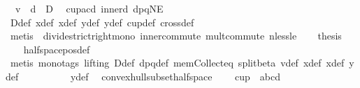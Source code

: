 \begin{isabellebody}
\ {}{\isacharcolon}{\kern0pt}\ {\isachardoublequoteopen}v\ {\isasymbullet}\ d\ {\isasymge}\ D{\isachardoublequoteclose}\ \isamarkupfalse%
\ cup{\isacharunderscore}{\kern0pt}acd\ inner{\isacharunderscore}{\kern0pt}d{}\ dpqNE{}\isanewline
\ \ \ \ \ \ \isamarkupfalse%
\ D{\isacharunderscore}{\kern0pt}def\ x{}{\isacharunderscore}{\kern0pt}def\ x{}{\isacharunderscore}{\kern0pt}def\ y{}{\isacharunderscore}{\kern0pt}def\ y{}{\isacharunderscore}{\kern0pt}def\ cup{}{\isacharunderscore}{\kern0pt}def\ cross{}{\isacharunderscore}{\kern0pt}def\isanewline
\ \ \ \ \ \ \isamarkupfalse%
\ {\isacharparenleft}{\kern0pt}metis\ {\isachardoublequoteopen}{}{\isachardoublequoteclose}\ divide{\isacharunderscore}{\kern0pt}strict{\isacharunderscore}{\kern0pt}right{\isacharunderscore}{\kern0pt}mono\ inner{\isacharunderscore}{\kern0pt}commute\ mult{\isachardot}{\kern0pt}commute\ nless{\isacharunderscore}{\kern0pt}le{\isacharparenright}{\kern0pt}\isanewline
\ \ \isamarkupfalse%
\ {\isacharquery}{\kern0pt}thesis\ \isamarkupfalse%
\ {}\ \isamarkupfalse%
\ halfspace{\isacharunderscore}{\kern0pt}pos{\isacharunderscore}{\kern0pt}def\isanewline
\ \ \ \ \ \ \isamarkupfalse%
\ {\isacharparenleft}{\kern0pt}metis\ {\isacharparenleft}{\kern0pt}mono{\isacharunderscore}{\kern0pt}tags{\isacharcomma}{\kern0pt}\ lifting{\isacharparenright}{\kern0pt}\ D{\isacharunderscore}{\kern0pt}def\ dpq{\isacharunderscore}{\kern0pt}def\ mem{\isacharunderscore}{\kern0pt}Collect{\isacharunderscore}{\kern0pt}eq\ split{\isacharunderscore}{\kern0pt}beta\ v{\isacharunderscore}{\kern0pt}def\ x{}{\isacharunderscore}{\kern0pt}def\ x{}{\isacharunderscore}{\kern0pt}def\ y{}{\isacharunderscore}{\kern0pt}def\isanewline
\ \ \ \ \ \ \ \ \ \ y{}{\isacharunderscore}{\kern0pt}def{\isacharparenright}{\kern0pt}\ \isanewline
{}\isamarkupfalse%
%
\endisatagproof
{\isafoldproof}%
%
\isadelimproof
\isanewline
%
\endisadelimproof
\isanewline
{}\isamarkupfalse%
\ convex{\isacharunderscore}{\kern0pt}hull{\isacharunderscore}{\kern0pt}subset{\isacharunderscore}{\kern0pt}halfspace{\isacharcolon}{\kern0pt}\ \isanewline
\ \ \ {\isachardoublequoteopen}cup\ {}\ {\isacharbrackleft}{\kern0pt}a{\isacharcomma}{\kern0pt}b{\isacharcomma}{\kern0pt}c{\isacharcomma}{\kern0pt}d{\isacharbrackright}{\kern0pt}{\isachardoublequoteclose}\isanewline

\end{isabellebody}

